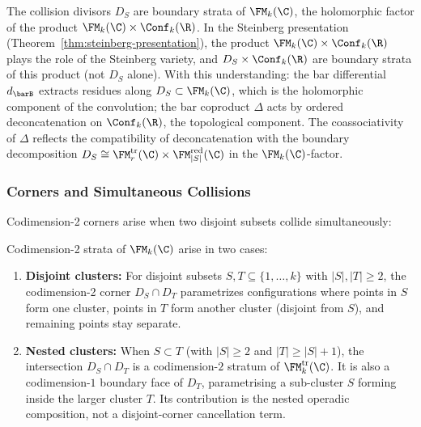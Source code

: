 \begin{remark}
\label{rem:collision-steinberg}
The collision divisors $D_S$ are boundary strata of $\FM_k(\C)$,
the holomorphic factor of the product
$\FM_k(\C) \times \Conf_k(\R)$. In the Steinberg presentation
(Theorem~\ref{thm:steinberg-presentation}), the product
$\FM_k(\C) \times \Conf_k(\R)$ plays the role of the Steinberg
variety, and $D_S \times \Conf_k(\R)$ are boundary strata of this
product (not $D_S$ alone). With this understanding: the bar
differential $d_{\barB}$ extracts residues along
$D_S \subset \FM_k(\C)$, which is the holomorphic component of
the convolution; the bar coproduct $\Delta$ acts by ordered
deconcatenation on $\Conf_k(\R)$, the topological component.
The coassociativity of $\Delta$ reflects the compatibility of
deconcatenation with the boundary decomposition
$D_S \cong \FM_r^{\mathrm{tr}}(\C) \times
\FM_{|S|}^{\mathrm{red}}(\C)$ in the
$\FM_k(\C)$-factor.
\end{remark}

\subsubsection{Corners and Simultaneous Collisions}

Codimension-2 corners arise when two disjoint subsets collide simultaneously:

\begin{definition}
\label{def:codim2-corners}
Codimension-2 strata of $\FM_k(\C)$ arise in two cases:
\begin{enumerate}[label=(\alph*)]
\item \textbf{Disjoint clusters:} For disjoint subsets $S, T \subseteq \{1,\ldots,k\}$ with $|S|, |T| \geq 2$, the codimension-2 corner $D_S \cap D_T$ parametrizes configurations where points in $S$ form one cluster, points in $T$ form another cluster (disjoint from $S$), and remaining points stay separate.

\item \textbf{Nested clusters:} When \(S\subset T\) (with
\(|S|\ge2\) and \(|T|\ge |S|+1\)), the intersection \(D_S\cap D_T\)
is a codimension-\(2\) stratum of \(\FM_k^{\mathrm{tr}}(\C)\).  It is
also a codimension-\(1\) boundary face of \(D_T\), parametrising a
sub-cluster \(S\) forming inside the larger cluster \(T\).  Its
contribution is the nested operadic composition, not a disjoint-corner
cancellation term.
\end{enumerate}
\end{definition}

